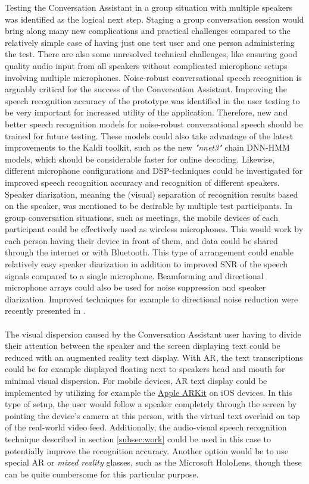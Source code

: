 \documentclass[english, 12pt, a4paper, pdftex, elec, utf8]{aaltothesis}
\begin{document}
Testing the Conversation Assistant in a group situation with multiple speakers was identified as the logical next step. Staging a group conversation session would bring along many new complications and practical challenges compared to the relatively simple case of having just one test user and one person administering the test. There are also some unresolved technical challenges, like ensuring good quality audio input from all speakers without complicated microphone setups involving multiple microphones. Noise-robust conversational speech recognition is arguably critical for the success of the Conversation Assistant. Improving the speech recognition accuracy of the prototype was identified in the user testing to be very important for increased utility of the application. Therefore, new and better speech recognition models for noise-robust conversational speech should be trained for future testing. These models could also take advantage of the latest improvements to the Kaldi toolkit, such as the new \textit{"nnet3"} chain DNN-HMM models, which should be considerable faster for online decoding. Likewise, different microphone configurations and DSP-techniques could be investigated for improved speech recognition accuracy and recognition of different speakers. Speaker diarization, meaning the (visual) separation of recognition results based on the speaker, was mentioned to be desirable by multiple test participants. In group conversation situations, such as meetings, the mobile devices of each participant could be effectively used as wireless microphones. This would work by each person having their device in front of them, and data could be shared through the internet or with Bluetooth. This type of arrangement could enable relatively easy speaker diarization in addition to improved SNR of the speech signals compared to a single microphone. Beamforming and directional microphone arrays could also be used for noise suppression and speaker diarization. Improved techniques for example to directional noise reduction were recently presented in \cite{delikaris2017parametric}. \\\\
The visual dispersion caused by the Conversation Assistant user having to divide their attention between the speaker and the screen displaying text could be reduced with an augmented reality text display. With AR, the text transcriptions could be for example displayed floating next to speakers head and mouth for minimal visual dispersion. For mobile devices, AR text display could be implemented by utilizing for example the \href{https://developer.apple.com/arkit/}{Apple ARKit} on iOS devices. In this type of setup, the user would follow a speaker completely through the screen by pointing the device's camera at this person, with the virtual text overlaid on top of the real-world video feed. Additionally, the audio-visual speech recognition technique described in section \ref{subsec:work} could be used in this case to potentially improve the recognition accuracy. Another option would be to use special AR or \textit{mixed reality} glasses, such as the Microsoft HoloLens, though these can be quite cumbersome for this particular purpose. 
\end{document}
